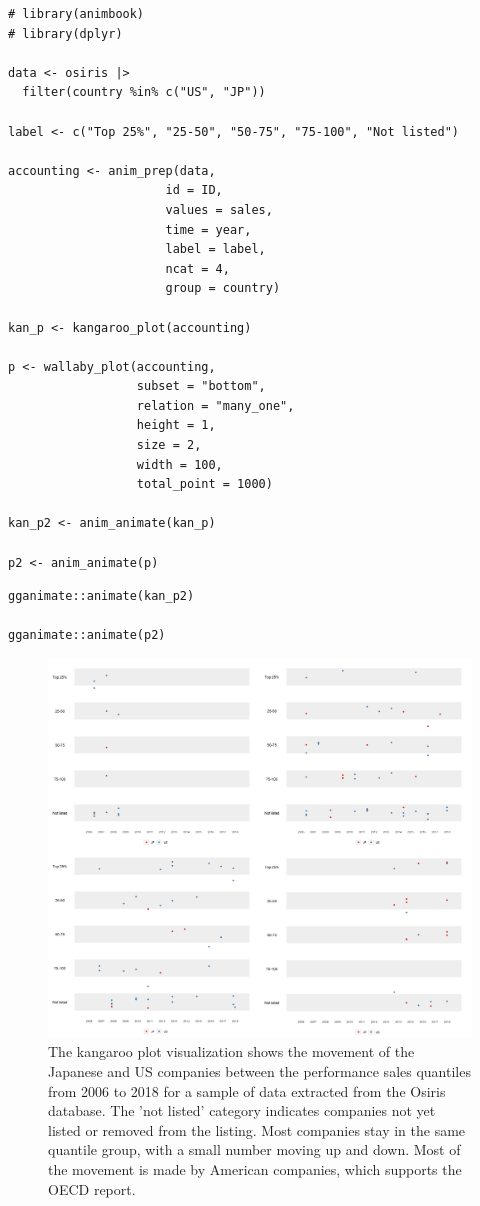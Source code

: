 \begin{verbatim}
# library(animbook)
# library(dplyr)

data <- osiris |> 
  filter(country %in% c("US", "JP"))

label <- c("Top 25%", "25-50", "50-75", "75-100", "Not listed")

accounting <- anim_prep(data, 
                      id = ID, 
                      values = sales, 
                      time = year, 
                      label = label, 
                      ncat = 4, 
                      group = country)

kan_p <- kangaroo_plot(accounting)

p <- wallaby_plot(accounting,
                  subset = "bottom",
                  relation = "many_one",
                  height = 1,
                  size = 2,
                  width = 100,
                  total_point = 1000)

kan_p2 <- anim_animate(kan_p)

p2 <- anim_animate(p)
\end{verbatim}

\begin{verbatim}
gganimate::animate(kan_p2)

gganimate::animate(p2)
\end{verbatim}

\begin{figure}

{\centering \includegraphics[width=1\linewidth]{figures/osiris} 

}

\caption{The kangaroo plot visualization shows the movement of the Japanese and US companies between the performance sales quantiles from 2006 to 2018 for a sample of data extracted from the Osiris database. The 'not listed' category indicates companies not yet listed or removed from the listing. Most companies stay in the same quantile group, with a small number moving up and down. Most of the movement is made by American companies, which supports the OECD report.}\label{fig:kan-osiris-figure}
\end{figure}

